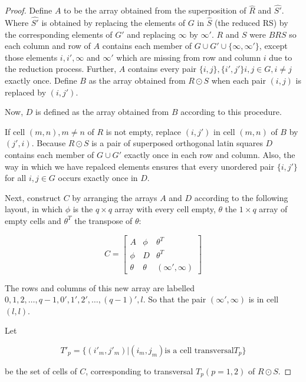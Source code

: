 \documentclass[
  11pt,
  a4paper]{book}
\begin{document}
\begin{proof}
Define $A$ to be the array obtained from the superposition of $\hat{R}$
and $\hat{S'}$. Where $\hat{S'}$ is obtained by replacing the elements
of $G$ in $\hat{S}$ (the reduced RS) by the corresponding elements of
$G'$ and replacing $\infty$ by $\infty'$. $R$ and $S$ were $BRS$ so each
column and row of $A$ contains each member of
$G \cup G' \cup \{\infty, \infty'\}$, except those elements $i,i',\infty$
and $\infty'$ which are missing from row and column $i$ due to the
reduction process. Further, $A$ contains every pair
$\{i,j\},\{i',j'\} i,j \in G,i \neq j$ exactly once.
Define $B$ as the array obtained from $R \odot S$ when each pair $(i,j)$
is replaced by $(i, j')$.

Now, $D$ is defined as the array obtained from $B$ according to this
procedure.

If cell $(m, n), m\neq n$ of $R$ is not empty, replace
$(i, j')$ in cell $(m, n)$ of $B$ by $(j', i)$. Because
$R \odot S$ is a pair of superposed orthogonal latin squares
$D$ contains each member of $G \cup G'$ exactly once in each
row and column. Also, the way in which we have repalced
elements ensures that every unordered pair $\{i, j'\}$ for
all $i, j \in G$ occurs exactly once in $D$.

Next, construct $C$ by arranging the arrays $A$ and $D$ according to the
following layout, in which $\phi$ is the $q \times q$ array with every
cell empty, $\theta$ the $1 \times q$ array of empty cells and
$\theta ^T$ the transpose of $\theta$:

\begin{equation}
C = \begin{bmatrix}
A & \phi & \theta^T \\
\phi & D & \theta^T \\
\theta & \theta & (\infty',\infty)
\end{bmatrix}
\end{equation}

The rows and columns of this new array are labelled
$0, 1, 2, \ldots, q - 1, 0', 1', 2', \ldots, (q - 1)',l$.
So that the pair $(\infty ', \infty)$ is in cell $(l, l)$.

Let

\begin{equation}
 T'_p = \{ (i'_m,j'_m) | (i_m,j_m) \text{is a cell transversal} T_p \}
\end{equation}

be the set of cells of $C$, corresponding to transversal
$T_p (p=1,2)$ of $R \odot S$.


\end{proof}
\end{document}
